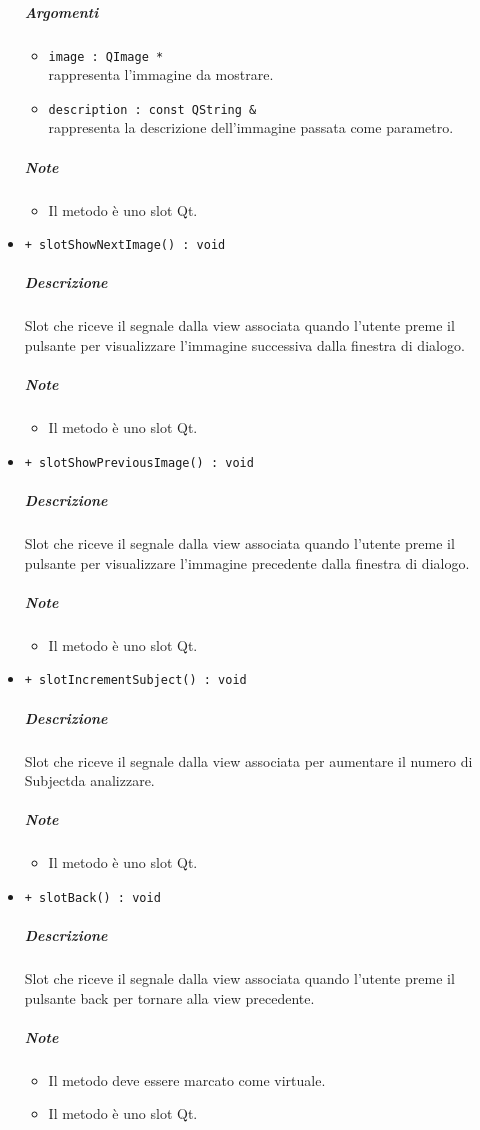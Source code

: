\begin{itemize}
			\color{black}
			\subparagraph{Argomenti}
			\begin{itemize}
				\item \color{RoyalPurple} \verb!image : QImage *!\\				
\color{black} rappresenta l'immagine da mostrare.
				\item \color{RoyalPurple} \verb!description : const QString &!\\				
\color{black} rappresenta la descrizione dell'immagine  passata come parametro.
			\end{itemize}
			\subparagraph{Note}
			\begin{itemize}
				\item Il metodo è uno slot\g{} Qt\g{}.
			\end{itemize}
			\item \color{blue} \verb!+ slotShowNextImage() : void!
			\color{black}
			\subparagraph{Descrizione} Slot\g{} che riceve il segnale dalla view associata quando l'utente preme il pulsante per visualizzare l'immagine successiva dalla finestra di dialogo.
			\subparagraph{Note}
			\begin{itemize}
				\item Il metodo è uno slot\g{} Qt\g{}.
			\end{itemize}
			\item \color{blue} \verb!+ slotShowPreviousImage() : void!
			\color{black}
			\subparagraph{Descrizione} Slot\g{} che riceve il segnale dalla view associata quando l'utente preme il pulsante per visualizzare l'immagine precedente dalla finestra di dialogo.
			\subparagraph{Note}
			\begin{itemize}
				\item Il metodo è uno slot\g{} Qt\g{}.
			\end{itemize}
			\item \color{blue} \verb!+ slotIncrementSubject() : void!
			\color{black}
			\subparagraph{Descrizione} Slot\g{} che riceve il segnale dalla view associata per aumentare il numero di Subject\g{}da analizzare.
			\subparagraph{Note}
			\begin{itemize}
				\item Il metodo è uno slot\g{} Qt\g{}.
			\end{itemize}
			\item \color{blue} \verb!+ slotBack() : void!
			\color{black}
			\subparagraph{Descrizione} Slot\g{} che riceve il segnale dalla view associata quando l'utente preme il pulsante back per tornare alla view precedente.
			\subparagraph{Note}
			\begin{itemize}
				\item Il metodo deve essere marcato come virtuale.
				\item Il metodo è uno slot\g{} Qt\g{}.
			\end{itemize}
		\end{itemize}
		\pagebreak
